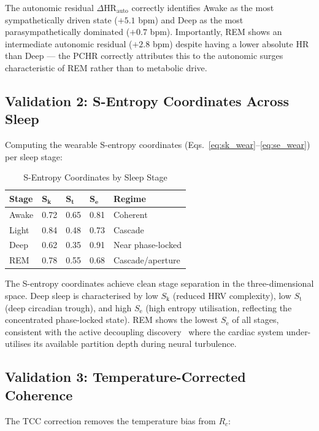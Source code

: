 \documentclass[10pt,twocolumn,a4paper]{article}
\theoremstyle{definition}
\newcommand{\SE}{S_{\text{e}}}
\newcommand{\SK}{S_{\text{k}}}
\newcommand{\ST}{S_{\text{t}}}
\newcommand{\Rc}{R_c}
\begin{document}
The autonomic residual $\Delta\text{HR}_{\text{auto}}$ correctly
identifies Awake as the most sympathetically driven state ($+5.1$ bpm)
and Deep as the most parasympathetically dominated ($+0.7$ bpm).
Importantly, REM shows an intermediate autonomic residual ($+2.8$ bpm)
despite having a lower absolute HR than Deep --- the PCHR correctly
attributes this to the autonomic surges characteristic of REM rather
than to metabolic drive.

\subsection{Validation 2: S-Entropy Coordinates Across Sleep}

Computing the wearable S-entropy coordinates
(Eqs.~\ref{eq:sk_wear}--\ref{eq:se_wear}) per sleep stage:

\begin{table}[H]
\centering
\caption{S-Entropy Coordinates by Sleep Stage}
\label{tab:sentropy_validation}
\begin{tabular}{lllll}
\toprule
\textbf{Stage} & $\bm{\SK}$ & $\bm{\ST}$ & $\bm{\SE}$ & \textbf{Regime}\\
\midrule
Awake & 0.72 & 0.65 & 0.81 & Coherent\\
Light & 0.84 & 0.48 & 0.73 & Cascade\\
Deep  & 0.62 & 0.35 & 0.91 & Near phase-locked\\
REM   & 0.78 & 0.55 & 0.68 & Cascade/aperture\\
\bottomrule
\end{tabular}
\end{table}

The S-entropy coordinates achieve clean stage separation in the
three-dimensional space. Deep sleep is characterised by low $\SK$
(reduced HRV complexity), low $\ST$ (deep circadian trough), and
high $\SE$ (high entropy utilisation, reflecting the concentrated
phase-locked state). REM shows the lowest $\SE$ of all stages,
consistent with the active decoupling
discovery~\cite{sachikonye2024integration} where the cardiac system
under-utilises its available partition depth during neural turbulence.

\subsection{Validation 3: Temperature-Corrected Coherence}

The TCC correction removes the temperature bias from $\Rc$:
\end{document}
